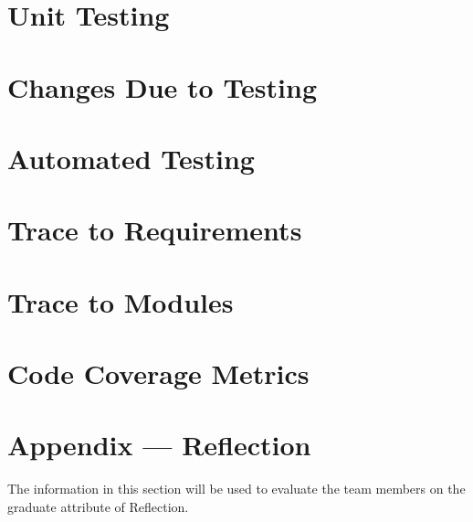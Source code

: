 \documentclass[12pt, titlepage]{article}
\begin{document}

\section{Unit Testing}

\section{Changes Due to Testing}


\section{Automated Testing}
		
\section{Trace to Requirements}
		
\section{Trace to Modules}		

\section{Code Coverage Metrics}




\newpage{}
\section*{Appendix --- Reflection}

The information in this section will be used to evaluate the team members on the
graduate attribute of Reflection.


\end{document}

